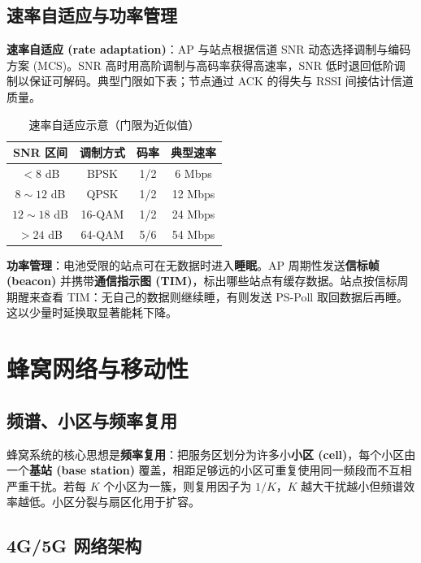 \subsection{速率自适应与功率管理}

\textbf{速率自适应 (rate adaptation)}：AP 与站点根据信道 SNR 动态选择调制与编码方案 (MCS)。SNR 高时用高阶调制与高码率获得高速率，SNR 低时退回低阶调制以保证可解码。典型门限如下表；节点通过 ACK 的得失与 RSSI 间接估计信道质量。

\begin{table}[H]
\centering
\caption{速率自适应示意（门限为近似值）}
\renewcommand{\arraystretch}{1.3}
\begin{tabulary}{\textwidth}{@{}CCCC@{}}
\toprule
\textbf{SNR 区间} & \textbf{调制方式} & \textbf{码率} & \textbf{典型速率} \\
\midrule
$<8$ dB & BPSK & 1/2 & 6 Mbps \\
$8\sim12$ dB & QPSK & 1/2 & 12 Mbps \\
$12\sim18$ dB & 16-QAM & 1/2 & 24 Mbps \\
$>24$ dB & 64-QAM & 5/6 & 54 Mbps \\
\bottomrule
\end{tabulary}
\end{table}

\textbf{功率管理}：电池受限的站点可在无数据时进入\textbf{睡眠}。AP 周期性发送\textbf{信标帧 (beacon)} 并携带\textbf{通信指示图 (TIM)}，标出哪些站点有缓存数据。站点按信标周期醒来查看 TIM：无自己的数据则继续睡，有则发送 PS-Poll 取回数据后再睡。这以少量时延换取显著能耗下降。

\section{蜂窝网络与移动性}

\subsection{频谱、小区与频率复用}

蜂窝系统的核心思想是\textbf{频率复用}：把服务区划分为许多小\textbf{小区 (cell)}，每个小区由一个\textbf{基站 (base station)} 覆盖，相距足够远的小区可重复使用同一频段而不互相严重干扰。若每 $K$ 个小区为一簇，则复用因子为 $1/K$，$K$ 越大干扰越小但频谱效率越低。小区分裂与扇区化用于扩容。

\subsection{4G/5G 网络架构}

